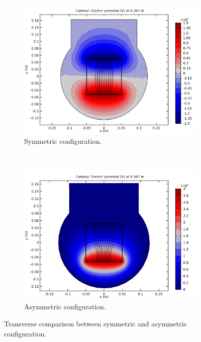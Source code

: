 \begin{figure}[!ht]
	\begin{subfigure}[t]{0.5\textwidth}
		\includegraphics[width=\textwidth]{03_Prototype/figures/fig021_image_asym_sym_b.png}
		\caption{Symmetric configuration.}
		\label{chap3:asym_sym_b}
	\end{subfigure}
	~
	\begin{subfigure}[t]{0.5\textwidth}
		\includegraphics[width=\textwidth]{03_Prototype/figures/fig021_image_asym_sym_a.png}
		\caption{Asymmetric configuration.}
		\label{chap3:asym_sym_a}
	\end{subfigure}
	\caption[Transverse comparison between symmetric and asymmetric configuration]{Transverse comparison between symmetric and asymmetric configuration.}
	\label{chap3:asym_sym}
\end{figure}
